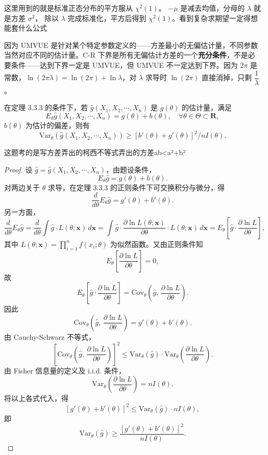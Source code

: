 \begin{dxtips}
   这里用到的就是标准正态分布的平方服从 $\chi^2(1)$。
$-\mu$ 是减去均值，分母的 $\lambda$ 就是方差 $\sigma^2$，
除以 $\lambda$ 完成标准化，平方后得到 $\chi^2(1)$。看到复杂求期望一定得想能套什么公式
\end{dxtips}
\begin{dxtips}
    因为 UMVUE 是针对某个特定参数定义的——方差最小的无偏估计量，不同参数当然对应不同的估计量。C-R 下界是所有无偏估计方差的一个\textbf{充分条件}，不是必要条件——达到下界一定是 UMVUE，但 UMVUE 不一定达到下界。因为 $2\pi$ 是常数，$\ln(2\pi\lambda) = \ln(2\pi) + \ln\lambda$，对 $\lambda$ 求导时 $\ln(2\pi)$ 直接消掉，只剩 $\dfrac{1}{\lambda}$。
\end{dxtips}
\begin{homework}[14]
在定理 3.3.3 的条件下，若 $\hat{g}(X_1, X_2, \cdots, X_n)$ 是 $g(\theta)$ 的估计量，满足
\[
E_\theta \hat{g}(X_1, X_2, \cdots, X_n) = g(\theta) + b(\theta), \quad \forall \theta \in \Theta \subset \mathbf{R},
\]
$b(\theta)$ 为估计的偏差，则有
\[
\mathrm{Var}_\theta(\hat{g}(X_1, X_2, \cdots, X_n)) \geq [b'(\theta) + g'(\theta)]^2 / nI(\theta).
\]
\end{homework}
\begin{dxtips}
    这题考的是写方差弄出的柯西不等式弄出的方差ab<a²+b²
\end{dxtips}
\begin{proof}
设 $\hat{g} = \hat{g}(X_1, X_2, \cdots, X_n)$，由题设条件，
\[
E_\theta \hat{g} = g(\theta) + b(\theta).
\]
对两边关于 $\theta$ 求导，在定理 3.3.3 的正则条件下可交换积分与微分，得
\[
\frac{d}{d\theta} E_\theta \hat{g} = g'(\theta) + b'(\theta).
\]
另一方面，
\[
\frac{d}{d\theta} E_\theta \hat{g} = \frac{d}{d\theta} \int \hat{g} \cdot L(\theta; \mathbf{x}) \, d\mathbf{x} = \int \hat{g} \cdot \frac{\partial \ln L(\theta; \mathbf{x})}{\partial \theta} \cdot L(\theta; \mathbf{x}) \, d\mathbf{x} = E_\theta\!\left[\hat{g} \cdot \frac{\partial \ln L}{\partial \theta}\right],
\]
其中 $L(\theta; \mathbf{x}) = \prod_{i=1}^n f(x_i; \theta)$ 为似然函数。又由正则条件知
\[
E_\theta\!\left[\frac{\partial \ln L}{\partial \theta}\right] = 0,
\]
故
\[
E_\theta\!\left[\hat{g} \cdot \frac{\partial \ln L}{\partial \theta}\right] = \mathrm{Cov}_\theta\!\left(\hat{g},\, \frac{\partial \ln L}{\partial \theta}\right).
\]
因此
\[
\mathrm{Cov}_\theta\!\left(\hat{g},\, \frac{\partial \ln L}{\partial \theta}\right) = g'(\theta) + b'(\theta).
\]
由 Cauchy-Schwarz 不等式，
\[
\left[\mathrm{Cov}_\theta\!\left(\hat{g},\, \frac{\partial \ln L}{\partial \theta}\right)\right]^2 \leq \mathrm{Var}_\theta(\hat{g}) \cdot \mathrm{Var}_\theta\!\left(\frac{\partial \ln L}{\partial \theta}\right).
\]
由 Fisher 信息量的定义及 i.i.d. 条件，
\[
\mathrm{Var}_\theta\!\left(\frac{\partial \ln L}{\partial \theta}\right) = nI(\theta).
\]
将以上各式代入，得
\[
[g'(\theta) + b'(\theta)]^2 \leq \mathrm{Var}_\theta(\hat{g}) \cdot nI(\theta),
\]
即
\[
\mathrm{Var}_\theta(\hat{g}) \geq \frac{[g'(\theta) + b'(\theta)]^2}{nI(\theta)}.
\]
\end{proof}
